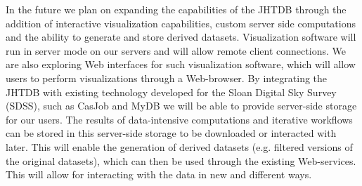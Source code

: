 \documentclass[10pt,twocolumn]{article}
\begin{document}
In the future we plan on expanding the capabilities of the JHTDB through the addition of interactive visualization capabilities, 
custom server side computations and the ability to generate and store derived datasets. Visualization software will run in server
mode on our servers and will allow remote client connections. We are also exploring Web interfaces for such visualization software, which will allow users
to perform visualizations through a Web-browser. By integrating the JHTDB with existing technology developed for the Sloan Digital Sky Survey (SDSS), such
as CasJob and MyDB \cite{LiThakar} we will be able to provide server-side storage for our users. The results of data-intensive computations and iterative 
workflows can be stored in this server-side storage to be downloaded or interacted with later. This will enable the generation of derived datasets (e.g.
filtered versions of the original datasets), which can then be used through the existing Web-services. This will allow for interacting with the data in new
and different ways.


\vfill

\newpage
   
 
\end{document}
